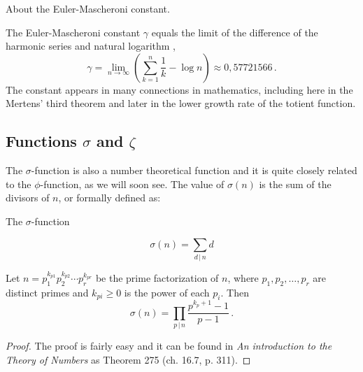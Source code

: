 \documentclass{article}
\begin{document}
\begin{remark}
About the Euler-Mascheroni constant.

The Euler-Mascheroni constant $\gamma$ equals the limit of the difference of the harmonic series and natural logarithm \emph{\cite{gamma}},
\begin{equation*}
    \gamma=\lim_{n\rightarrow\infty} \left(\sum_{k=1}^n \frac{1}{k} - \log n\right) \approx 0,57721566\,.
\end{equation*}
The constant appears in many connections in mathematics, including here in the Mertens' third theorem and later in the lower growth rate of the totient function.

\end{remark}

\subsection{Functions $\sigma$ and $\zeta$}

The $\sigma$-function is also a number theoretical function and it is quite closely related to the $\phi$-function, as we will soon see. The value of $\sigma(n)$ is the sum of the divisors of $n$, or formally defined as:

\begin{definition}
The $\sigma$-function

\begin{equation*}
    \sigma(n)=\sum_{d\,\vert\, n} d
\end{equation*}
\end{definition}

\begin{lemma}
\label{lemma:sigma}
Let $n=p_1^{k_{p1}}p_2^{k_{p2}}\cdots p_r^{k_{pr}}$ be the prime factorization of $n$, where $p_1,p_2,\dots,p_r$ are distinct primes and $k_{pi}\geq0$ is the power of each $p_i$. Then
\begin{equation*}
    \sigma(n) = \prod_{p\,\vert\, n} \frac{p^{k_p+1}-1}{p-1}\,.
\end{equation*}

\begin{proof}

The proof is fairly easy and it can be found in \textit{An introduction to the Theory of Numbers} \cite{HardyWright} as Theorem 275 (ch. 16.7, p. 311).
\end{proof}
\end{lemma}
\end{document}
